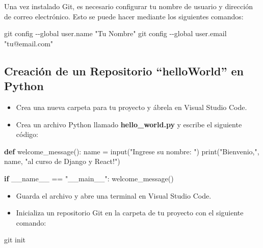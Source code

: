 \documentclass[
  a4paper,
  DIV=11,
  numbers=noendperiod,
  onepage,
  openany]{scrreprt}
\newenvironment{Shaded}{\begin{snugshade}}{\end{snugshade}}
\newcommand{\AttributeTok}[1]{\textcolor[rgb]{0.40,0.45,0.13}{#1}}
\newcommand{\BuiltInTok}[1]{\textcolor[rgb]{0.00,0.23,0.31}{#1}}
\newcommand{\ControlFlowTok}[1]{\textcolor[rgb]{0.00,0.23,0.31}{\textbf{#1}}}
\newcommand{\FunctionTok}[1]{\textcolor[rgb]{0.28,0.35,0.67}{#1}}
\newcommand{\KeywordTok}[1]{\textcolor[rgb]{0.00,0.23,0.31}{\textbf{#1}}}
\newcommand{\NormalTok}[1]{\textcolor[rgb]{0.00,0.23,0.31}{#1}}
\newcommand{\OperatorTok}[1]{\textcolor[rgb]{0.37,0.37,0.37}{#1}}
\newcommand{\StringTok}[1]{\textcolor[rgb]{0.13,0.47,0.30}{#1}}
\newcommand{\VariableTok}[1]{\textcolor[rgb]{0.07,0.07,0.07}{#1}}
\providecommand{\tightlist}{%
  \setlength{\itemsep}{0pt}\setlength{\parskip}{0pt}}\usepackage{longtable,booktabs,array}
\begin{document}
Una vez instalado Git, es necesario configurar tu nombre de usuario y
dirección de correo electrónico. Esto se puede hacer mediante los
siguientes comandos:

\begin{Shaded}
\begin{Highlighting}[]
\FunctionTok{git}\NormalTok{ config }\AttributeTok{{-}{-}global}\NormalTok{ user.name }\StringTok{"Tu Nombre"}
\FunctionTok{git}\NormalTok{ config }\AttributeTok{{-}{-}global}\NormalTok{ user.email }\StringTok{"tu@email.com"}
\end{Highlighting}
\end{Shaded}

\subsection{Creación de un Repositorio ``helloWorld'' en Python
🐍}\label{creaciuxf3n-de-un-repositorio-helloworld-en-python}

\begin{itemize}
\tightlist
\item
  Crea una nueva carpeta para tu proyecto y ábrela en Visual Studio
  Code.
\item
  Crea un archivo Python llamado \textbf{hello\_world.py} y escribe el
  siguiente código:
\end{itemize}

\begin{Shaded}
\begin{Highlighting}[]
\KeywordTok{def}\NormalTok{ welcome\_message():}
\NormalTok{    name }\OperatorTok{=} \BuiltInTok{input}\NormalTok{(}\StringTok{"Ingrese su nombre: "}\NormalTok{)}
    \BuiltInTok{print}\NormalTok{(}\StringTok{"Bienvenio,"}\NormalTok{, name, }\StringTok{"al curso de Django y React!"}\NormalTok{)}

\ControlFlowTok{if} \VariableTok{\_\_name\_\_} \OperatorTok{==} \StringTok{"\_\_main\_\_"}\NormalTok{:}
\NormalTok{    welcome\_message()}
\end{Highlighting}
\end{Shaded}

\begin{itemize}
\tightlist
\item
  Guarda el archivo y abre una terminal en Visual Studio Code.
\item
  Inicializa un repositorio Git en la carpeta de tu proyecto con el
  siguiente comando:
\end{itemize}

\begin{Shaded}
\begin{Highlighting}[]
\FunctionTok{git}\NormalTok{ init}
\end{Highlighting}
\end{Shaded}
\end{document}
